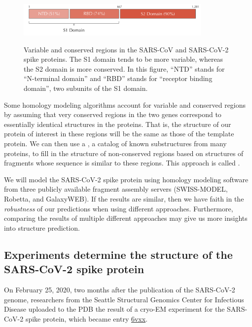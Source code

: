 \begin{figure}[h]
	\centering
	\mySfFamily
	\includegraphics[width = 0.85\textwidth]{../images/spike_protein_similarity.png}\\
	\caption{Variable and conserved regions in the SARS-CoV and SARS-CoV-2 spike proteins. The S1 domain tends to be more variable, whereas the S2 domain is more conserved. In this figure, ``NTD'' stands for ``N-terminal domain'' and ``RBD'' stands for ``receptor binding domain'', two subunits of the S1 domain.}
	\label{fig:spike_protein_similarity}
\end{figure}

Some homology modeling algorithms account for variable and conserved regions by assuming that very conserved regions in the two genes correspond to essentially identical structures in the proteins. That is, the structure of our protein of interest in these regions will be the same as those of the template protein. We can then use a , a catalog of known substructures from many proteins, to fill in the structure of non-conserved regions based on structures of fragments whose sequence is similar to these regions. This approach is called .

We will model the SARS-CoV-2 spike protein using homology modeling software from three publicly available fragment assembly servers (SWISS-MODEL, Robetta, and GalaxyWEB). If the results are similar, then we have faith in the \textit{robustness} of our predictions when using different approaches. Furthermore, comparing the results of multiple different approaches may give us more insights into structure prediction. 

\FloatBarrier

\subsection{Experiments determine the structure of the SARS-CoV-2 spike protein}

On February 25, 2020, two months after the publication of the SARS-CoV-2 genome, researchers from the Seattle Structural Genomics Center for Infectious Disease uploaded to the PDB the result of a cryo-EM experiment for the SARS-CoV-2 spike protein, which became entry \href{http://www.rcsb.org/structure/6VXX}{6vxx}.\\

